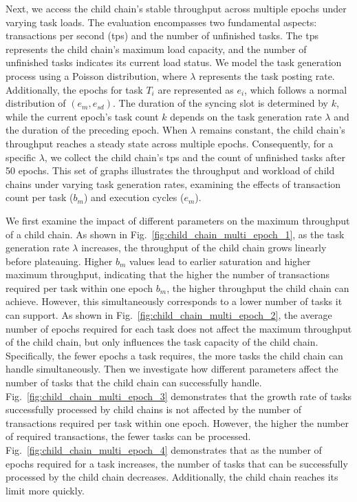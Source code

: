 \documentclass[10pt,journal]{IEEEtran}
\begin{document}
Next, we access the child chain's stable throughput across multiple epochs under varying task loads. The evaluation encompasses two fundamental aspects: transactions per second (tps) and the number of unfinished tasks. The tps represents the child chain's maximum load capacity, and the number of unfinished tasks indicates its current load status. We model the task generation process using a Poisson distribution, where $\lambda$ represents the task posting rate. Additionally, the epochs for task $T_i$ are represented as $e_i$, which follows a normal distribution of $(e_m, e_{sd})$. The duration of the syncing slot is determined by $k$, while the current epoch's task count $k$ depends on the task generation rate $\lambda$ and the duration of the preceding epoch. When $\lambda$ remains constant, the child chain's throughput reaches a steady state across multiple epochs. Consequently, for a specific $\lambda$, we collect the child chain's tps and the count of unfinished tasks after 50 epochs. This set of graphs illustrates the throughput and workload of child chains under varying task generation rates, examining the effects of transaction count per task ($b_m$) and execution cycles ($e_m$).


We first examine the impact of different parameters on the maximum throughput of a child chain. As shown in Fig.~\ref{fig:child_chain_multi_epoch_1}, as the task generation rate $\lambda$ increases, the throughput of the child chain grows linearly before plateauing. Higher $b_m$ values lead to earlier saturation and higher maximum throughput, indicating that the higher the number of transactions required per task within one epoch $b_m$, the higher throughput the child chain can achieve. However, this simultaneously corresponds to a lower number of tasks it can support. As shown in Fig.~\ref{fig:child_chain_multi_epoch_2}, the average number of epochs required for each task does not affect the maximum throughput of the child chain, but only influences the task capacity of the child chain. Specifically, the fewer epochs a task requires, the more tasks the child chain can handle simultaneously. Then we investigate how different parameters affect the number of tasks that the child chain can successfully handle. Fig.~\ref{fig:child_chain_multi_epoch_3} demonstrates that the growth rate of tasks successfully processed by child chains is not affected by the number of transactions required per task within one epoch. However, the higher the number of required transactions, the fewer tasks can be processed. Fig.~\ref{fig:child_chain_multi_epoch_4} demonstrates that as the number of epochs required for a task increases, the number of tasks that can be successfully processed by the child chain decreases. Additionally, the child chain reaches its limit more quickly.
\end{document}
